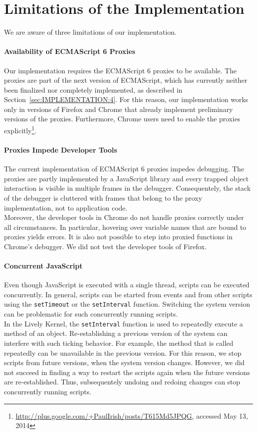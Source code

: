 \section{Limitations of the Implementation}

We are aware of three limitations of our implementation.

\paragraph{Availability of ECMAScript 6 Proxies}
Our implementation requires the ECMAScript 6 proxies to be available.
The proxies are part of the next version of ECMAScript, which has currently neither been finalized nor completely implemented, as described in Section~\ref{sec:IMPLEMENTATION:4}.
For this reason, our implementation works only in versions of Firefox and Chrome that already implement preliminary versions of the proxies.
Furthermore, Chrome users need to enable the proxies explicitly\footnote{\url{http://plus.google.com/+PaulIrish/posts/T615Md5JPQG}, accessed May 13, 2014}.

\paragraph{Proxies Impede Developer Tools}
The current implementation of ECMAScript 6 proxies impedes debugging.
The proxies are partly implemented by a JavaScript library and every trapped object interaction is visible in multiple frames in the debugger.
Consequentely, the stack of the debugger is cluttered with frames that belong to the proxy implementation, not to application code.\\
Moreover, the developer tools in Chrome do not handle proxies correctly under all circumstances.
In particular, hovering over variable names that are bound to proxies yields errors.
It is also not possible to step into proxied functions in Chrome's debugger.
We did not test the developer tools of Firefox.

\paragraph{Concurrent JavaScript}
Even though JavaScript is executed with a single thread, scripts can be executed concurrently.
In general, scripts can be started from events and from other scripts using the \lstinline{setTimeout} or the \lstinline{setInterval} function.
Switching the system version can be problematic for such concurrently running scripts.\\
In the Lively Kernel, the \lstinline{setInterval} function is used to repeatedly execute a method of an object.
Re-establishing a previous version of the system can interfere with such ticking behavior.
For example, the method that is called repeatedly can be unavailable in the previous version.
For this reason, we stop scripts from future versions, when the system version changes.
However, we did not succeed in finding a way to restart the scripts again when the future versions are re-established.
Thus, subsequentely undoing and redoing changes can stop concurrently running scripts.
